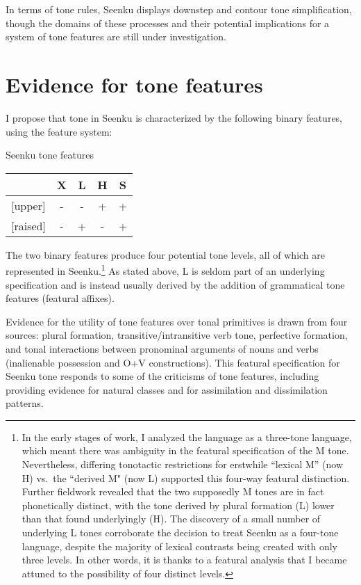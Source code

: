 \documentclass[output=paper]{langsci/langscibook}
\begin{document}
In terms of tone rules, Seenku displays downstep and contour tone simplification, though the domains of these processes and their potential implications for a system of tone features are still under investigation.


\section{Evidence for tone features}\label{sec:mcpherson:SecEvidence}

I propose that tone in Seenku is characterized by the following binary features, using the \citet{Pulleyblank86} feature system:

\ea\label{ex:mcpherson:5} Seenku tone features \\
\begin{tabular}[t]{|l|c|c|c|c|} \hline
   & X & L & H & S \\ \hline
  {[}upper{]} & - & - & + & + \\ \hline
  {[}raised{]} & - & + & - & + \\ \hline
\end{tabular}
\z

The two binary features produce four potential tone levels, all of which are represented in Seenku.\footnote{In the early stages of work, I analyzed the language as a three-tone language, which meant there was ambiguity in the featural specification of the M tone. Nevertheless, differing tonotactic restrictions for erstwhile ``lexical M'' (now H) vs.\ the ``derived M" (now L) supported this four-way featural distinction. Further fieldwork revealed that the two supposedly M tones are in fact phonetically distinct, with the tone derived by plural formation (L) lower than that found underlyingly (H). The discovery of a small number of underlying L tones corroborate the decision to treat Seenku as a four-tone language, despite the majority of lexical contrasts being created with only three levels. In other words, it is thanks to a featural analysis that I became attuned to the possibility of four distinct levels.} As stated above, L is seldom part of an underlying specification and is instead usually derived by the addition of grammatical tone features (featural affixes).

Evidence for the utility of tone features over tonal primitives is drawn from four sources: plural formation, transitive/intransitive verb tone, perfective formation, and tonal interactions between pronominal arguments of nouns and verbs (inalienable possession and O+V constructions). This featural specification for Seenku tone responds to some of the criticisms of tone features, including providing evidence for natural classes and for assimilation and dissimilation patterns.
\end{document}

